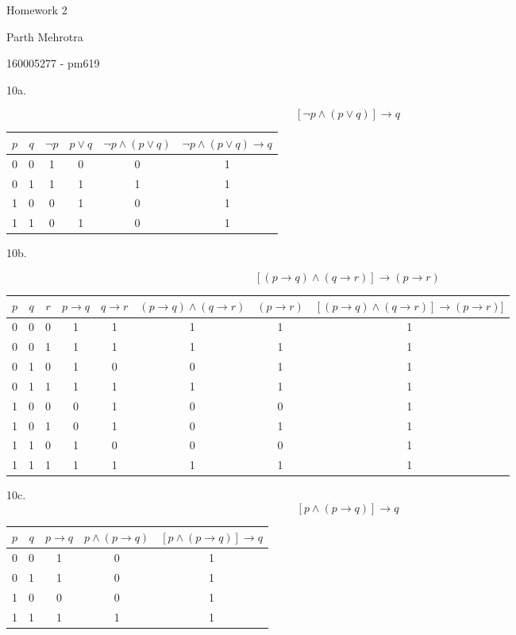 \documentclass{article}
\begin{document}
\centerline{\sc \large Homework 2}
\vspace{0.5pc}

\centerline{Parth Mehrotra}
\centerline{160005277 - pm619}
\vspace{2pc}


10a.

$$[\lnot p \land (p \lor q)] \rightarrow q$$

\begin{tabular}{c|c|c|c|c|c}
$p$ & $q$ & $\lnot p$ & $p \lor q$ & $\lnot p \land (p \lor q)$  & $\lnot p \land (p \lor q) \rightarrow q$ \\
\hline
0 & 0 & 1	     & 0			& 0							  & 1                                        \\
0 & 1 & 1	     & 1 			& 1							  & 1                                        \\
1 & 0 & 0	     & 1 			& 0							  & 1                                        \\
1 & 1 & 0	     & 1 			& 0							  & 1                                        \\
\end{tabular}


10b.

$$[(p \rightarrow q) \land (q \rightarrow r)] \rightarrow (p \rightarrow r)$$

\begin{tabular}{c|c|c|c|c|c|c|c}
$p$ & $q$ & $r$ & $p \rightarrow q$ & $q \rightarrow r$ & $(p \rightarrow q) \land (q \rightarrow r)$ & $(p \rightarrow r)$ & $[(p \rightarrow q) \land (q \rightarrow r)] \rightarrow (p \rightarrow r)]$ \\
\hline
0 & 0 & 0 & 1 & 1 & 1 & 1 & 1 \\
0 & 0 & 1 & 1 & 1 & 1 & 1 & 1 \\
0 & 1 & 0 & 1 & 0 & 0 & 1 & 1 \\
0 & 1 & 1 & 1 & 1 & 1 & 1 & 1 \\
1 & 0 & 0 & 0 & 1 & 0 & 0 & 1 \\
1 & 0 & 1 & 0 & 1 & 0 & 1 & 1 \\
1 & 1 & 0 & 1 & 0 & 0 & 0 & 1 \\ 
1 & 1 & 1 & 1 & 1 & 1 & 1 & 1 \\

\end{tabular}


10c.
$$[p \land (p \rightarrow q)] \rightarrow q$$

\begin{tabular}{c|c|c|c|c}
$p$ & $q$ & $p \rightarrow q$ & $p \land (p \rightarrow q)$ & $[p \land (p \rightarrow q)] \rightarrow q$ \\
\hline
0 & 0 & 1 & 0 & 1 \\
0 & 1 & 1 & 0 & 1 \\
1 & 0 & 0 & 0 & 1 \\
1 & 1 & 1 & 1 & 1 \\
\end{tabular}
\end{document}
